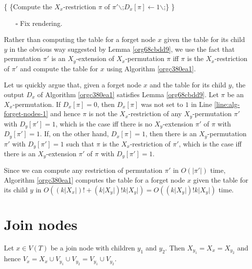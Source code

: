\documentclass[fontsize=11pt,paper=a4]{book}
\begin{document}
\begin{algorithm}
\DontPrintSemicolon
{}
\{
\{Compute the \(X_x\)-restriction \(\pi\) of \(\pi'\)$\backslash$;\label{line:alg-forget-nodes-1}\(D_x[\pi]\gets 1\)$\backslash$;\}
\}
\label{orgc380ea1}
\end{algorithm}

\begin{itemize}
\item[{$\square$}] Fix rendering.
\end{itemize}


Rather than computing the table for a forget node \(x\) given the table for its child \(y\) in the obvious way suggested by Lemma \ref{org68cbdd9}, we use the fact that permutation \(\pi'\) is an \(X_y\)-extension of \(X_x\)-permutation \(\pi\) iff \(\pi\) is the \(X_x\)-restriction of \(\pi'\) and compute the table for \(x\) using Algorithm \ref{orgc380ea1}.

Let us quickly argue that, given a forget node \(x\) and the table for its child \(y\), the output \(D_x\) of Algorithm \ref{orgc380ea1} satisfies Lemma \ref{org68cbdd9}.
Let \(\pi\) be an \(X_x\)-permutation.
If \(D_x[\pi]=0\), then \(D_x[\pi]\) was not set to \(1\) in Line \ref{line:alg-forget-nodes-1} and hence \(\pi\) is not the \(X_x\)-restriction of any \(X_y\)-permutation \(\pi'\) with \(D_y[\pi']=1\), which is the case iff there is no \(X_y\)-extension \(\pi'\) of \(\pi\) with \(D_y[\pi']=1\).
If, on the other hand, \(D_x[\pi]=1\), then there is an \(X_y\)-permutation \(\pi'\) with \(D_y[\pi']=1\) such that \(\pi\) is the \(X_x\)-restriction of \(\pi'\), which is the case iff there is an \(X_y\)-extension \(\pi'\) of \(\pi\) with \(D_y[\pi']=1\).

Since we can compute any restriction of permutation \(\pi'\) in \(O(\lvert\pi'\rvert)\) time, Algorithm \ref{orgc380ea1} computes the table for a forget node \(x\) given the table for its child \(y\) in \(O((k\lvert X_x\rvert)!+(k\lvert X_y\rvert)!k\lvert X_y\rvert)=O((k\lvert X_y\rvert)!k\lvert X_y\rvert)\) time.

\section{Join nodes}
\label{sec:org4c5bd4d}

Let \(x\in V(T)\) be a join node with children \(y_1\) and \(y_2\).
Then \(X_{y_1}=X_x=X_{y_2}\) and hence \(V_x=X_x\cup V_{y_1}\cup V_{y_2}=V_{y_1}\cup V_{y_2}\).
\end{document}
